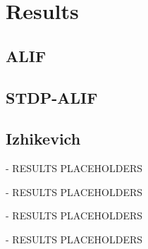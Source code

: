\chapter{Results}\label{ch:results}

\section{ALIF}

\section{STDP-ALIF}

\section{Izhikevich}

\begin{tcolorbox}[colback=orange]
- RESULTS PLACEHOLDERS
\vspace{20cm}

\end{tcolorbox}
\begin{tcolorbox}[colback=orange]
- RESULTS PLACEHOLDERS
\vspace{20cm}

\end{tcolorbox}
\begin{tcolorbox}[colback=orange]
- RESULTS PLACEHOLDERS
\vspace{20cm}

\end{tcolorbox}
\begin{tcolorbox}[colback=orange]
- RESULTS PLACEHOLDERS
\vspace{20cm}

\end{tcolorbox}

